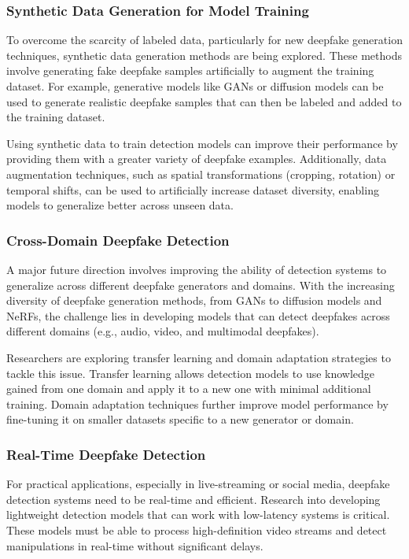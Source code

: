 \documentclass[lettersize,journal]{IEEEtran}
\begin{document}
\subsubsection{Synthetic Data Generation for Model Training}

To overcome the scarcity of labeled data, particularly for new deepfake generation techniques, synthetic data generation methods are being explored. These methods involve generating fake deepfake samples artificially to augment the training dataset. For example, generative models like GANs or diffusion models can be used to generate realistic deepfake samples that can then be labeled and added to the training dataset.

Using synthetic data to train detection models can improve their performance by providing them with a greater variety of deepfake examples. Additionally, data augmentation techniques, such as spatial transformations (cropping, rotation) or temporal shifts, can be used to artificially increase dataset diversity, enabling models to generalize better across unseen data.

\subsubsection{Cross-Domain Deepfake Detection}

A major future direction involves improving the ability of detection systems to generalize across different deepfake generators and domains. With the increasing diversity of deepfake generation methods, from GANs to diffusion models and NeRFs, the challenge lies in developing models that can detect deepfakes across different domains (e.g., audio, video, and multimodal deepfakes).

Researchers are exploring transfer learning and domain adaptation strategies to tackle this issue. Transfer learning allows detection models to use knowledge gained from one domain and apply it to a new one with minimal additional training. Domain adaptation techniques further improve model performance by fine-tuning it on smaller datasets specific to a new generator or domain.
\cite{wang2024timely}
\subsubsection{Real-Time Deepfake Detection}

For practical applications, especially in live-streaming or social media, deepfake detection systems need to be real-time and efficient. Research into developing lightweight detection models that can work with low-latency systems is critical. These models must be able to process high-definition video streams and detect manipulations in real-time without significant delays.
\end{document}
